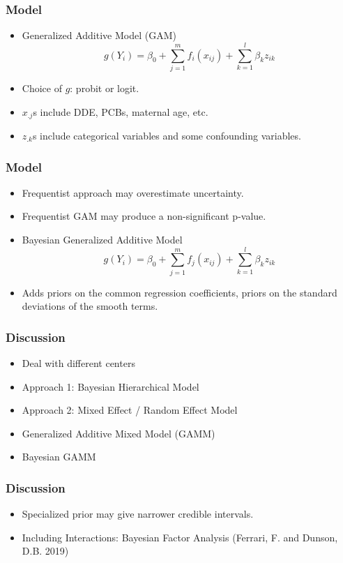 \documentclass{beamer}
\begin{document}
\begin{frame}
\frametitle{Model}


\begin{itemize}
\item Generalized Additive Model (GAM)
$$g(Y_i) = \beta_0 + \sum_{j=1}^m f_i(x_{ij}) + \sum_{k=1}^l \beta_{k}z_{ik}$$

\item Choice of $g$: probit or logit.
\item $x_{.j}$s include DDE, PCBs, maternal age, etc.
\item $z_{.k}$s include categorical variables and some confounding variables.

\end{itemize}
\end{frame}




\begin{frame}
\frametitle{Model}

\begin{itemize}

\item Frequentist approach may overestimate uncertainty.
\item Frequentist GAM may produce a non-significant p-value.
\pause
\item Bayesian Generalized Additive Model
$$g(Y_i) = \beta_0 + \sum_{j=1}^m f_j(x_{ij}) + \sum_{k=1}^l \beta_{k}z_{ik}$$

\item Adds priors on the common regression coefficients, priors on the standard deviations of the smooth terms.


\end{itemize}
\end{frame}




\begin{frame}
\frametitle{Discussion}

\begin{itemize}

\item Deal with different centers
\pause
\item Approach 1: Bayesian Hierarchical Model
\pause
\item Approach 2: Mixed Effect / Random Effect Model
\pause
\item Generalized Additive Mixed Model (GAMM)
\item Bayesian GAMM 


\end{itemize}
\end{frame}


\begin{frame}
\frametitle{Discussion}

\begin{itemize}


\item Specialized prior may give narrower credible intervals.
\pause
\item Including Interactions: Bayesian Factor Analysis (Ferrari, F. and Dunson, D.B. 2019)



\end{itemize}
\end{frame}
\end{document}
